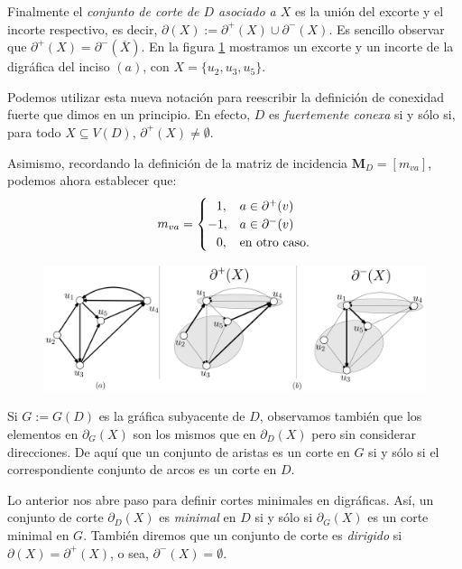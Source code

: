  Finalmente el \textit{conjunto de corte de $D$ asociado a $X$}  es la unión del excorte y el incorte respectivo, es decir, $\partial(X) := \partial^{+}(X) \cup \partial^{-}(X)$. Es sencillo observar que $\partial^{+}(X) = \partial^{-}(\overline{X})$. En la figura \ref{fig:excorteincorte} mostramos un excorte y un incorte de la digráfica del inciso $(a)$, con $X=\{u_{2},u_{3},u_{5}\}$.

 

Podemos utilizar esta nueva notación para reescribir la definición de conexidad fuerte que dimos en un principio. En efecto, $D$ es \textit{fuertemente conexa} si y sólo si, para todo $X \subseteq V(D)$, $\partial^{+}(X) \neq \emptyset$. 

Asimismo, recordando la definición de la matriz de incidencia $\mathbf{M}_{D} = [m_{va}]$, podemos ahora establecer que:
\begin{equation} \label{eq:mva}
  m_{va}=
    \begin{cases}
\hspace{0.7em} 1, & a \in \partial^{+}(v)\\ 
-1, & a \in \partial^{-}(v)\\ 
\hspace{0.7em} 0, & \text{en otro caso}.
\end{cases}
\end{equation}

 \begin{figure}[H]
    \centering
\includegraphics[scale=0.18]{img/imgchapter2/ExcorteIncorte.jpg}
    \caption{}
    \label{fig:excorteincorte}
\end{figure}

Si $G:=G(D)$ es la gráfica subyacente de $D$, observamos también que los elementos en $\partial_{G}(X)$ son los mismos que en $\partial_{D}(X)$ pero sin considerar direcciones. De aquí que un conjunto de aristas es un corte en $G$ si y sólo si el correspondiente conjunto de arcos es un corte en $D$.

Lo anterior nos abre paso para definir cortes minimales en digráficas. Así, un conjunto de corte $\partial_{D}(X)$ es \textit{minimal}  en $D$ si y sólo si $\partial_{G}(X)$ es un corte minimal en $G$. También diremos que un conjunto de corte es \textit{dirigido} si $\partial(X) = \partial^{+}(X)$, o sea, $\partial^{-}(X)=\emptyset$.

